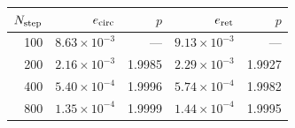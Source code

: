 \begin{tabular}{rrrrr}\toprule
$N_{\rm step}$ & $e_{\rm circ}$ & $p$ & $e_{\rm ret}$ & $p$ \\
\midrule
100 & $8.63\times 10^{-3}$ & --- & $9.13\times 10^{-3}$ & --- \\
200 & $2.16\times 10^{-3}$ & 1.9985 & $2.29\times 10^{-3}$ & 1.9927 \\
400 & $5.40\times 10^{-4}$ & 1.9996 & $5.74\times 10^{-4}$ & 1.9982 \\
800 & $1.35\times 10^{-4}$ & 1.9999 & $1.44\times 10^{-4}$ & 1.9995 \\
\bottomrule\end{tabular}
